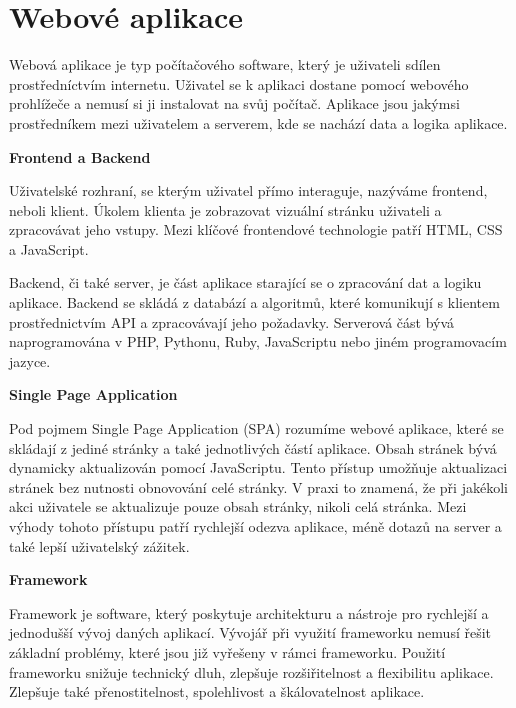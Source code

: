 \section{Webové aplikace}

\begin{zvyraznenyodstavec}
Webová aplikace je typ počítačového software, který je uživateli sdílen prostředníctvím internetu. 
Uživatel se k aplikaci dostane pomocí webového prohlížeče a nemusí si ji instalovat na svůj počítač. 
Aplikace jsou jakýmsi prostředníkem mezi uživatelem a serverem, kde se nachází data a logika aplikace.\cite{codeacademywebapp}

\begin{flushleft}
  \textbf{Frontend a Backend}
\end{flushleft}

Uživatelské rozhraní, se kterým uživatel přímo interaguje, nazýváme frontend, neboli klient.
Úkolem klienta je zobrazovat vizuální stránku uživateli a zpracovávat jeho vstupy. 
Mezi klíčové frontendové technologie patří HTML, CSS a JavaScript.

Backend, či také server, je část aplikace starající se o zpracování dat a logiku aplikace. 
Backend se skládá z databází a algoritmů, které komunikují s klientem prostřednictvím API a zpracovávají jeho požadavky. 
Serverová část bývá naprogramována v PHP, Pythonu, Ruby, JavaScriptu nebo jiném programovacím jazyce.\cite{stateofartframeworks}

\begin{flushleft}
  \textbf{Single Page Application}
\end{flushleft}

Pod pojmem Single Page Application (SPA) rozumíme webové aplikace, které se skládají z jediné stránky a také jednotlivých částí aplikace. 
Obsah stránek bývá dynamicky aktualizován pomocí JavaScriptu. Tento přístup umožňuje aktualizaci stránek bez nutnosti obnovování celé stránky. 
V praxi to znamená, že při jakékoli akci uživatele se aktualizuje pouze obsah stránky, nikoli celá stránka. 
Mezi výhody tohoto přístupu patří rychlejší odezva aplikace, méně dotazů na server a také lepší uživatelský zážitek.\cite{jadhavspa}

\begin{flushleft}
  \textbf{Framework}
\end{flushleft}

Framework je software, který poskytuje architekturu a nástroje pro rychlejší a jednodušší vývoj daných aplikací. 
Vývojář při využití frameworku nemusí řešit základní problémy, které jsou již vyřešeny v rámci frameworku. 
Použití frameworku snižuje technický dluh, zlepšuje rozšiřitelnost a flexibilitu aplikace. 
Zlepšuje také přenostitelnost, spolehlivost a škálovatelnost aplikace.\cite{schmidtframeworks}
\end{zvyraznenyodstavec}